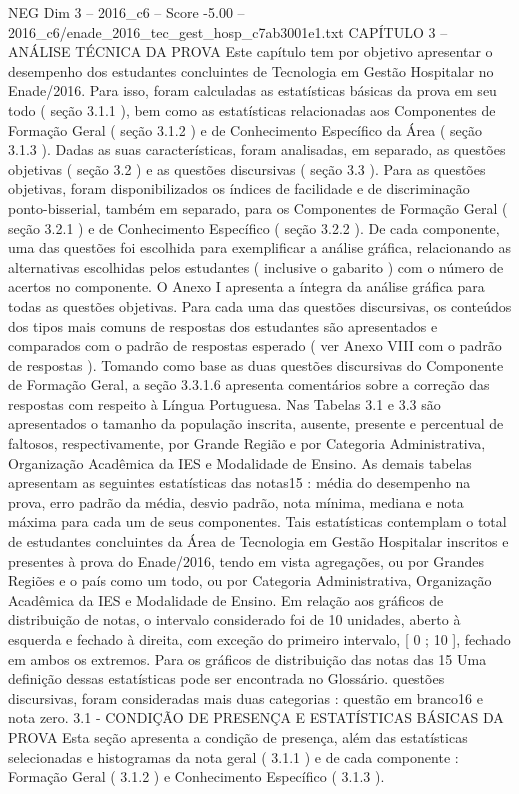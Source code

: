 \begin{textsample}{NEG Dim 3 – 2016\_c6 – Score -5.00 – 2016\_c6/enade\_2016\_tec\_gest\_hosp\_c7ab3001e1.txt}  \label{ex:f3_neg_038}
CAPÍTULO 3 – ANÁLISE TÉCNICA DA PROVA Este capítulo tem por objetivo apresentar o desempenho dos estudantes concluintes de Tecnologia em Gestão Hospitalar no Enade/2016.
Para isso, foram calculadas as estatísticas básicas da prova em seu todo ( seção 3.1.1 ), bem como as estatísticas relacionadas aos Componentes de Formação Geral ( seção 3.1.2 ) e de Conhecimento Específico da Área ( seção 3.1.3 ).
Dadas as suas características, foram analisadas, em separado, as questões objetivas ( seção 3.2 ) e as questões discursivas ( seção 3.3 ).
Para as questões objetivas, foram disponibilizados os índices de facilidade e de discriminação ponto-bisserial, também em separado, para os Componentes de Formação Geral ( seção 3.2.1 ) e de Conhecimento Específico ( seção 3.2.2 ).
De cada componente, uma das questões foi escolhida para exemplificar a análise gráfica, relacionando as alternativas escolhidas pelos estudantes ( inclusive o gabarito ) com o número de acertos no componente.
O Anexo I apresenta a íntegra da análise gráfica para todas as questões objetivas.
Para cada uma das questões discursivas, os conteúdos dos tipos mais comuns de respostas dos estudantes são apresentados e comparados com o padrão de respostas esperado ( ver Anexo VIII com o padrão de respostas ).
Tomando como base as duas questões discursivas do Componente de Formação Geral, a seção 3.3.1.6 apresenta comentários sobre a correção das respostas com respeito à Língua Portuguesa.
Nas Tabelas 3.1 e 3.3 são apresentados o tamanho da população inscrita, ausente, presente e percentual de faltosos, respectivamente, por Grande Região e por Categoria Administrativa, Organização Acadêmica da IES e Modalidade de Ensino.
As demais tabelas apresentam as seguintes estatísticas das notas15 : média do desempenho na prova, erro padrão da média, desvio padrão, nota mínima, mediana e nota máxima para cada um de seus componentes.
Tais estatísticas contemplam o total de estudantes concluintes da Área de Tecnologia em Gestão Hospitalar inscritos e presentes à prova do Enade/2016, tendo em vista agregações, ou por Grandes Regiões e o país como um todo, ou por Categoria Administrativa, Organização Acadêmica da IES e Modalidade de Ensino.
Em relação aos gráficos de distribuição de notas, o intervalo considerado foi de 10 unidades, aberto à esquerda e fechado à direita, com exceção do primeiro intervalo, [ 0 ; 10 ], fechado em ambos os extremos.
Para os gráficos de distribuição das notas das 15 Uma definição dessas estatísticas pode ser encontrada no Glossário. questões discursivas, foram consideradas mais duas categorias : questão em branco16 e nota zero. 3.1 - CONDIÇÃO DE PRESENÇA E ESTATÍSTICAS BÁSICAS DA PROVA Esta seção apresenta a condição de presença, além das estatísticas selecionadas e histogramas da nota geral ( 3.1.1 ) e de cada componente : Formação Geral ( 3.1.2 ) e Conhecimento Específico ( 3.1.3 ).

\end{textsample}
